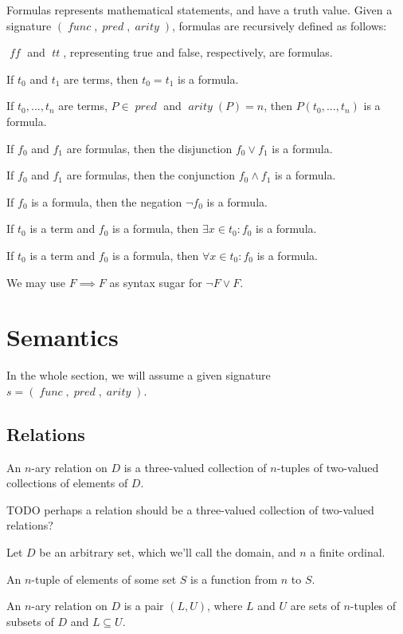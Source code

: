 \documentclass[oneside,12pt]{book}
\theoremstyle{definition}
\theoremstyle{remark}
\newcommand\var[1]{\mathop{\mathit{#1}}\nolimits}
\newcommand{\false}{\var{tt}}
\newcommand{\true}{\var{ff}}
\newcommand{\func}{\var{func}}
\newcommand{\pred}{\var{pred}}
\newcommand{\arity}{\var{arity}}
\begin{document}
\noindent Formulas represents mathematical statements, and have a truth value.
Given a signature $(\func, \pred, \arity)$, formulas are recursively defined as follows:
\begin{compactenum}
  \item $\true$ and $\false$, representing true and false, respectively, are formulas.
  \item If $t_0$ and $t_1$ are terms, then $t_0 = t_1$ is a formula.
  \item If $t_0, ..., t_n$ are terms, $P \in \pred$ and $\arity(P) = n$,
    then $P(t_0, ..., t_n)$ is a formula.
  \item If $f_0$ and $f_1$ are formulas, then the disjunction $f_0 \lor f_1$ is a formula.
  \item If $f_0$ and $f_1$ are formulas, then the conjunction $f_0 \land f_1$ is a formula.
  \item If $f_0$ is a formula, then the negation $\neg f_0$ is a formula.
  \item If $t_0$ is a term and $f_0$ is a formula, then $\exists x \in t_0\colon f_0$
    is a formula.
  \item If $t_0$ is a term and $f_0$ is a formula, then $\forall x \in t_0\colon f_0$
    is a formula.
\end{compactenum}

\noindent We may use $F \implies F$ as syntax sugar for $\neg F \lor F$.

\section{Semantics}
In the whole section, we will assume a given signature $s = (\func, \pred, \arity)$.

\subsection{Relations}

An $n$-ary relation on $D$ is a three-valued collection of $n$-tuples
of two-valued collections of elements of $D$.

TODO perhaps a relation should be a three-valued collection of two-valued relations?


\begin{defBox}
  Let $D$ be an arbitrary set, which we'll call the domain, and $n$ a finite ordinal.
  
  \medskip \noindent An $n$-tuple of elements of some set $S$ is a function from $n$ to $S$.
  
  \medskip \noindent An $n$-ary relation on $D$ is a pair $(L, U)$,
  where $L$ and $U$ are sets of $n$-tuples of subsets of $D$ and $L \subseteq U$.
\end{defBox}
\end{document}
